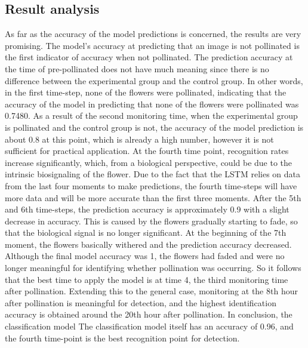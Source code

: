 \documentclass[11pt,a4paper]{article}
\begin{document}
\begin{spacing}{1.5}
\subsection{Result analysis}
As far as the accuracy of the model predictions is concerned, the results are very promising. The model's accuracy at predicting that an image is not pollinated is the first indicator of accuracy when not pollinated. The prediction accuracy at the time of pre-pollinated does not have much meaning since there is no difference between the experimental group and the control group. In other words, in the first time-step, none of the flowers were pollinated, indicating that the accuracy of the model in predicting that none of the flowers were pollinated was 0.7480. As a result of the second monitoring time, when the experimental group is pollinated and the control group is not, the accuracy of the model prediction is about 0.8 at this point, which is already a high number, however it is not sufficient for practical application. At the fourth time point, recognition rates increase significantly, which, from a biological perspective, could be due to the intrinsic biosignaling of the flower. Due to the fact that the LSTM relies on data from the last four moments to make predictions, the fourth time-steps will have more data and will be more accurate than the first three moments.
After the 5th and 6th time-steps, the prediction accuracy is approximately 0.9 with a slight decrease in accuracy. This is caused by the flowers gradually starting to fade, so that the biological signal is no longer significant. At the beginning of the 7th moment, the flowers basically withered and the prediction accuracy decreased. Although the final model accuracy was 1, the flowers had faded and were no longer meaningful for identifying whether pollination was occurring. So it follows that the best time to apply the model is at time 4, the third monitoring time after pollination. Extending this to the general case, monitoring at the 8th hour after pollination is meaningful for detection, and the highest identification accuracy is obtained around the 20th hour after pollination. In conclusion, the classification model The classification model itself has an accuracy of 0.96, and the fourth time-point is the best recognition point for detection.



\end{spacing}
\end{document}
